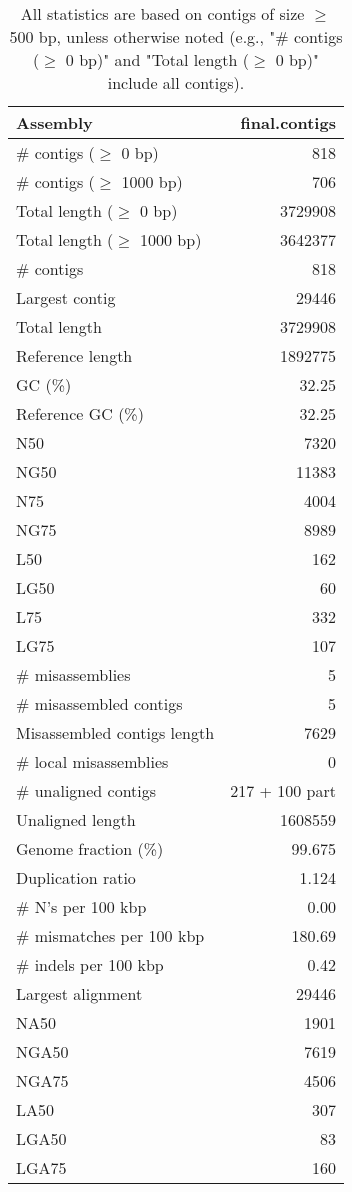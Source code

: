 \documentclass[12pt,a4paper]{article}
\begin{document}
\begin{table}[ht]
\begin{center}
\caption{All statistics are based on contigs of size $\geq$ 500 bp, unless otherwise noted (e.g., "\# contigs ($\geq$ 0 bp)" and "Total length ($\geq$ 0 bp)" include all contigs).}
\begin{tabular}{|l*{1}{|r}|}
\hline
Assembly & final.contigs \\ \hline
\# contigs ($\geq$ 0 bp) & 818 \\ \hline
\# contigs ($\geq$ 1000 bp) & 706 \\ \hline
Total length ($\geq$ 0 bp) & 3729908 \\ \hline
Total length ($\geq$ 1000 bp) & 3642377 \\ \hline
\# contigs & 818 \\ \hline
Largest contig & 29446 \\ \hline
Total length & 3729908 \\ \hline
Reference length & 1892775 \\ \hline
GC (\%) & 32.25 \\ \hline
Reference GC (\%) & 32.25 \\ \hline
N50 & 7320 \\ \hline
NG50 & 11383 \\ \hline
N75 & 4004 \\ \hline
NG75 & 8989 \\ \hline
L50 & 162 \\ \hline
LG50 & 60 \\ \hline
L75 & 332 \\ \hline
LG75 & 107 \\ \hline
\# misassemblies & 5 \\ \hline
\# misassembled contigs & 5 \\ \hline
Misassembled contigs length & 7629 \\ \hline
\# local misassemblies & 0 \\ \hline
\# unaligned contigs & 217 + 100 part \\ \hline
Unaligned length & 1608559 \\ \hline
Genome fraction (\%) & 99.675 \\ \hline
Duplication ratio & 1.124 \\ \hline
\# N's per 100 kbp & 0.00 \\ \hline
\# mismatches per 100 kbp & 180.69 \\ \hline
\# indels per 100 kbp & 0.42 \\ \hline
Largest alignment & 29446 \\ \hline
NA50 & 1901 \\ \hline
NGA50 & 7619 \\ \hline
NGA75 & 4506 \\ \hline
LA50 & 307 \\ \hline
LGA50 & 83 \\ \hline
LGA75 & 160 \\ \hline
\end{tabular}
\end{center}
\end{table}
\end{document}
